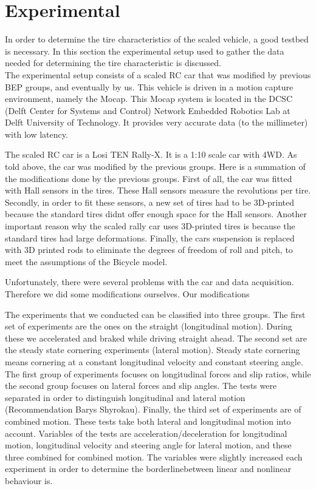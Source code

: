 \section{Experimental}
 

In order to determine the tire characteristics of the scaled vehicle, a good testbed is necessary. In this section the experimental setup used to gather the data needed for determining the tire characteristic is discussed.\\
The experimental setup consists of a scaled RC car that was modified by previous BEP groups, and eventually by us. This vehicle is driven in a motion capture environment, namely the Mocap. This Mocap system is located in the DCSC (Delft Center for Systems and Control) Network Embedded Robotics Lab at Delft University of Technology.
It provides very accurate data (to the millimeter) with low latency. 

The scaled RC car is a Losi TEN Rally-X. It is a 1:10 scale car with 4WD. As told above, the car was modified by the previous groups. Here is a summation of the modifications done by the previous groups. 
First of all, the car was fitted with Hall sensors in the tires. These Hall sensors measure the revolutions per tire. Secondly, in order to fit these sensors, a new set of tires had to be 3D-printed because the standard tires didn\textquotesingle t offer enough space for the Hall sensors. Another important reason why the scaled rally car uses 3D-printed tires is because the standard tires had large deformations. Finally, the car\textquotesingle s suspension is replaced with 3D printed rods to eliminate the degrees of freedom of roll and pitch, to meet the assumptions of the Bicycle model. 

Unfortunately, there were several problems with the car and data acquisition. Therefore we did some modifications ourselves. Our modifications

The experiments that we conducted can be classified into three groups. The first set of experiments are the ones on the straight (longitudinal motion). During these we accelerated and braked while driving straight ahead. The second set are the steady state cornering experiments (lateral motion). Steady state cornering means cornering at a constant longitudinal velocity and constant steering angle. The first group of experiments focuses on longitudinal forces and slip ratios, while the second group focuses on lateral forces and slip angles. The tests were separated in order to distinguish longitudinal and lateral motion (Recommendation Barys Shyrokau). Finally, the third set of experiments are of combined motion. These tests take both lateral and longitudinal motion into account. 
	Variables of the tests are acceleration/deceleration for longitudinal motion, longitudinal velocity and steering angle for lateral motion, and these three combined for  combined motion. The variables were slightly increased each experiment in order to determine the \textquotesingle borderline\textquotesingle  between linear and nonlinear behaviour is. 

